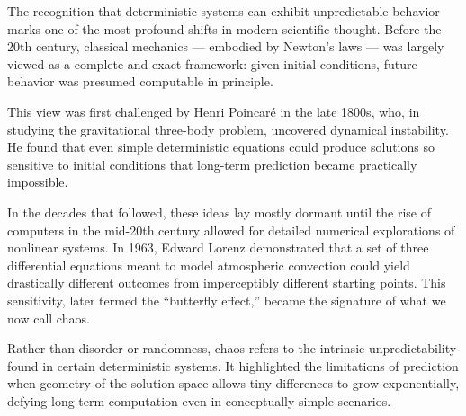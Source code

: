 \begin{historical}
The recognition that deterministic systems can exhibit unpredictable behavior marks one of the most profound shifts in modern scientific thought. Before the 20th century, classical mechanics — embodied by Newton’s laws — was largely viewed as a complete and exact framework: given initial conditions, future behavior was presumed computable in principle. 

This view was first challenged by Henri Poincaré in the late 1800s, who, in studying the gravitational three-body problem, uncovered dynamical instability. He found that even simple deterministic equations could produce solutions so sensitive to initial conditions that long-term prediction became practically impossible. 

In the decades that followed, these ideas lay mostly dormant until the rise of computers in the mid-20th century allowed for detailed numerical explorations of nonlinear systems. In 1963, Edward Lorenz demonstrated that a set of three differential equations meant to model atmospheric convection could yield drastically different outcomes from imperceptibly different starting points. This sensitivity, later termed the “butterfly effect,” became the signature of what we now call chaos. 

Rather than disorder or randomness, chaos refers to the intrinsic unpredictability found in certain deterministic systems. It highlighted the limitations of prediction when geometry of the solution space allows tiny differences to grow exponentially, defying long-term computation even in conceptually simple scenarios.
\end{historical}

